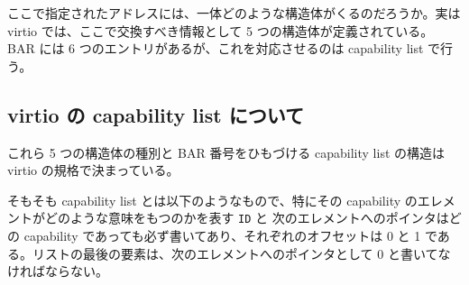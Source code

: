 \documentclass[a4paper,11pt,report]{ltjsbook}
\begin{document}
ここで指定されたアドレスには、一体どのような構造体がくるのだろうか。実は virtio では、ここで交換すべき情報として 5 つの構造体が定義されている。 BAR には 6 つのエントリがあるが、これを対応させるのは capability list で行う。

\subsection{virtio の capability list について}

これら 5 つの構造体の種別と BAR 番号をひもづける capability list の構造は virtio の規格で決まっている。

そもそも capability list とは以下のようなもので、特にその capability のエレメントがどのような意味をもつのかを表す \texttt{ID} と 次のエレメントへのポインタはどの capability であっても必ず書いてあり、それぞれのオフセットは 0 と 1 である。リストの最後の要素は、次のエレメントへのポインタとして 0 と書いてなければならない。
\end{document}

